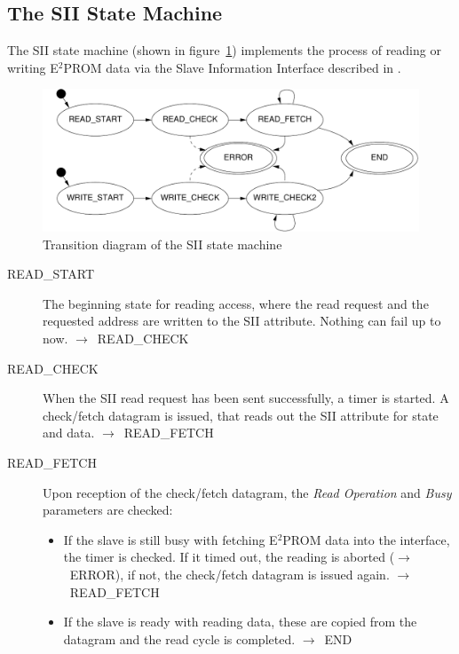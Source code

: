 \documentclass[a4paper,12pt,BCOR6mm,bibtotoc,idxtotoc]{scrbook}
\begin{document}

\subsection{The SII State Machine}
\label{sec:fsm-sii}

The SII state machine (shown in figure~\ref{fig:fsm-sii})
implements the process of reading or writing E$^2$PROM data via the
Slave Information Interface described in \cite[section~5.4]{alspec}.

\begin{figure}[htbp]
  \centering
  \includegraphics[width=.9\textwidth]{images/fsm-sii}
  \caption{Transition diagram of the SII state machine}
  \label{fig:fsm-sii}
\end{figure}

\begin{description}
\item[READ\_START] The beginning state for reading access, where the
  read request and the requested address are written to the SII
  attribute. Nothing can fail up to now.
  $\rightarrow$~READ\_CHECK

\item[READ\_CHECK] When the SII read request has been sent
  successfully, a timer is started. A check/fetch datagram is issued,
  that reads out the SII attribute for state and data.
  $\rightarrow$~READ\_FETCH

\item[READ\_FETCH] Upon reception of the check/fetch datagram, the
  \textit{Read Operation} and \textit{Busy} parameters are checked:
  \begin{itemize}
  \item If the slave is still busy with fetching E$^2$PROM data into
    the interface, the timer is checked. If it timed out, the reading
    is aborted ($\rightarrow$~ERROR), if not, the check/fetch datagram
    is issued again. $\rightarrow$~READ\_FETCH

  \item If the slave is ready with reading data, these are copied from
    the datagram and the read cycle is completed.
    $\rightarrow$~END
  \end{itemize}
\end{description}
\end{document}
